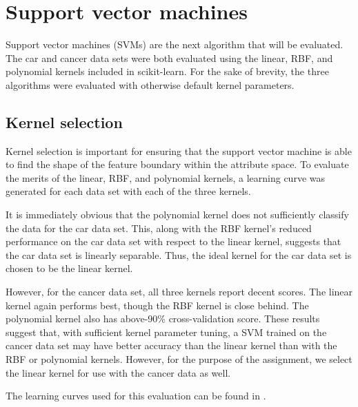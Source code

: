 \documentclass{article}
\begin{document}
    \section{Support vector machines}
    Support vector machines (SVMs) are the next algorithm that will be evaluated. The car and cancer data sets were both evaluated using the linear, RBF, and polynomial kernels included in scikit-learn. For the sake of brevity, the three algorithms were evaluated with otherwise default kernel parameters.

    \subsection{Kernel selection}
    Kernel selection is important for ensuring that the support vector machine is able to find the shape of the feature boundary within the attribute space. To evaluate the merits of the linear, RBF, and polynomial kernels, a learning curve was generated for each data set with each of the three kernels.

    It is immediately obvious that the polynomial kernel does not sufficiently classify the data for the car data set. This, along with the RBF kernel's reduced performance on the car data set with respect to the linear kernel, suggests that the car data set is linearly separable. Thus, the ideal kernel for the car data set is chosen to be the linear kernel.

    However, for the cancer data set, all three kernels report decent scores. The linear kernel again performs best, though the RBF kernel is close behind. The polynomial kernel also has above-90\% cross-validation score. These results suggest that, with sufficient kernel parameter tuning, a SVM trained on the cancer data set may have better accuracy than the linear kernel than with the RBF or polynomial kernels. However, for the purpose of the assignment, we select the linear kernel for use with the cancer data as well.

    The learning curves used for this evaluation can be found in .
\end{document}
